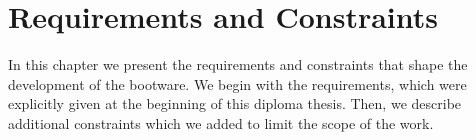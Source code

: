\chapter{Requirements and Constraints}
\label{requirements}

In this chapter we present the requirements and constraints that shape the development of the bootware.
We begin with the requirements, which were explicitly given at the beginning of this diploma thesis.
Then, we describe additional constraints which we added to limit the scope of the work.




